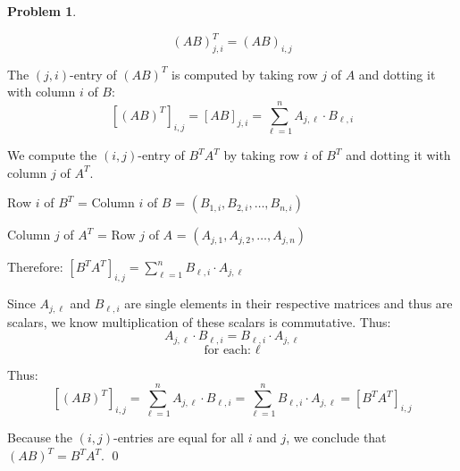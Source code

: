 \documentclass[12pt, oneside]{amsart}
\theoremstyle{definition}
\newtheorem{prob}{Problem}
\begin{document}
\begin{prob}
\begin{enumerate}
\begin{solution}
    \[
    (AB)^T_{j,i} = (A B)_{i,j}
    \]
    
    The $(j,i)$-entry of $(AB)^T$ is computed by taking row $j$ of $A$ and dotting it with column $i$ of $B$:
    \[
    [(AB)^T]_{i,j} = [AB]_{j,i} = \sum_{\ell=1}^{n} A_{j,\ell} \cdot B_{\ell,i}
    \]
    
    \vspace{0.3cm}
    
    We compute the $(i,j)$-entry of $B^T A^T$ by taking row $i$ of $B^T$ and dotting it with column $j$ of $A^T$. 
    
    \hspace{2em} Row $i$ of $B^T$ = Column $i$ of $B$ = $(B_{1,i}, B_{2,i}, \ldots, B_{n,i})$

    \hspace{2em} Column $j$ of $A^T$ = Row $j$ of $A$ = $(A_{j,1}, A_{j,2}, \ldots, A_{j,n})$

    
    Therefore:
    $[B^T A^T]_{i,j} = \sum_{\ell=1}^{n} B_{\ell,i} \cdot A_{j,\ell}$
    
    \vspace{0.3cm}

    Since $A_{j,\ell}$ and $B_{\ell,i}$ are single elements in their respective matrices and thus are scalars, we know multiplication of these scalars is commutative. Thus:
    \[
      A_{j,\ell} \cdot B_{\ell,i} = B_{\ell,i} \cdot A_{j,\ell}
    \]
    \[
    \text{for each: } \ell
    \]
    
    Thus:
    \[
    [(AB)^T]_{i,j} = \sum_{\ell=1}^{n} A_{j,\ell} \cdot B_{\ell,i} = \sum_{\ell=1}^{n} B_{\ell,i} \cdot A_{j,\ell} = [B^T A^T]_{i,j}
    \]
    
    
    Because the $(i,j)$-entries are equal for all $i$ and $j$, we conclude that $(AB)^T = B^T A^T$. \qed
    \end{solution}

    \end{enumerate}

\end{prob}
\end{document}
